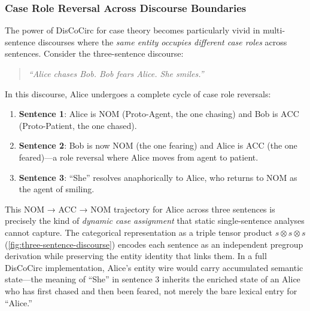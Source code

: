 \documentclass[
]{article}
\providecommand{\tightlist}{%
  \setlength{\itemsep}{0pt}\setlength{\parskip}{0pt}}
\numberwithin{equation}{section}
\begin{document}
\subsubsection{Case Role Reversal Across Discourse
Boundaries}\label{case-role-reversal-across-discourse-boundaries}

The power of DisCoCirc for case theory becomes particularly vivid in
multi-sentence discourses where the \emph{same entity occupies different
case roles} across sentences. Consider the three-sentence discourse:

\begin{quote}
\emph{``Alice chases Bob. Bob fears Alice. She smiles.''}
\end{quote}

In this discourse, Alice undergoes a complete cycle of case role
reversals:

\begin{enumerate}
\def\labelenumi{\arabic{enumi}.}
\tightlist
\item
  \textbf{Sentence 1}: Alice is \(\text{NOM}\) (Proto-Agent, the one
  chasing) and Bob is \(\text{ACC}\) (Proto-Patient, the one chased).
\item
  \textbf{Sentence 2}: Bob is now \(\text{NOM}\) (the one fearing) and
  Alice is \(\text{ACC}\) (the one feared)---a role reversal where Alice
  moves from agent to patient.
\item
  \textbf{Sentence 3}: ``She'' resolves anaphorically to Alice, who
  returns to \(\text{NOM}\) as the agent of smiling.
\end{enumerate}

This NOM → ACC → NOM trajectory for Alice across three sentences is
precisely the kind of \emph{dynamic case assignment} that static
single-sentence analyses cannot capture. The categorical representation
as a triple tensor product \(s \otimes s \otimes s\)
(\autoref{fig:three-sentence-discourse}) encodes each sentence as an
independent pregroup derivation while preserving the entity identity
that links them. In a full DisCoCirc implementation, Alice's entity wire
would carry accumulated semantic state---the meaning of ``She'' in
sentence 3 inherits the enriched state of an Alice who has first chased
and then been feared, not merely the bare lexical entry for ``Alice.''
\end{document}
